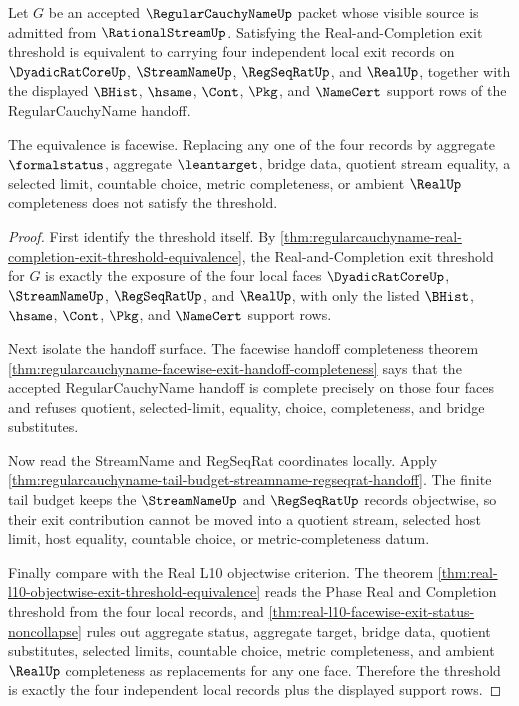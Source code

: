 \begin{theorem}
\label{thm:regularcauchyname-exit-threshold-facewise-locality}
Let $G$ be an accepted $\RegularCauchyNameUp$ packet whose visible source is admitted from $\RationalStreamUp$. Satisfying the Real-and-Completion exit threshold is equivalent to carrying four independent local exit records on $\DyadicRatCoreUp$, $\StreamNameUp$, $\RegSeqRatUp$, and $\RealUp$, together with the displayed $\BHist$, $\hsame$, $\Cont$, $\Pkg$, and $\NameCert$ support rows of the RegularCauchyName handoff.

The equivalence is facewise. Replacing any one of the four records by aggregate $\formalstatus$, aggregate $\leantarget$, bridge data, quotient stream equality, a selected limit, countable choice, metric completeness, or ambient $\RealUp$ completeness does not satisfy the threshold.
\end{theorem}
\begin{proof}
First identify the threshold itself. By \autoref{thm:regularcauchyname-real-completion-exit-threshold-equivalence}, the Real-and-Completion exit threshold for $G$ is exactly the exposure of the four local faces $\DyadicRatCoreUp$, $\StreamNameUp$, $\RegSeqRatUp$, and $\RealUp$, with only the listed $\BHist$, $\hsame$, $\Cont$, $\Pkg$, and $\NameCert$ support rows.

Next isolate the handoff surface. The facewise handoff completeness theorem \autoref{thm:regularcauchyname-facewise-exit-handoff-completeness} says that the accepted RegularCauchyName handoff is complete precisely on those four faces and refuses quotient, selected-limit, equality, choice, completeness, and bridge substitutes.

Now read the StreamName and RegSeqRat coordinates locally. Apply \autoref{thm:regularcauchyname-tail-budget-streamname-regseqrat-handoff}. The finite tail budget keeps the $\StreamNameUp$ and $\RegSeqRatUp$ records objectwise, so their exit contribution cannot be moved into a quotient stream, selected host limit, host equality, countable choice, or metric-completeness datum.

Finally compare with the Real L10 objectwise criterion. The theorem \autoref{thm:real-l10-objectwise-exit-threshold-equivalence} reads the Phase Real and Completion threshold from the four local records, and \autoref{thm:real-l10-facewise-exit-status-noncollapse} rules out aggregate status, aggregate target, bridge data, quotient substitutes, selected limits, countable choice, metric completeness, and ambient $\RealUp$ completeness as replacements for any one face. Therefore the threshold is exactly the four independent local records plus the displayed support rows.
\end{proof}

